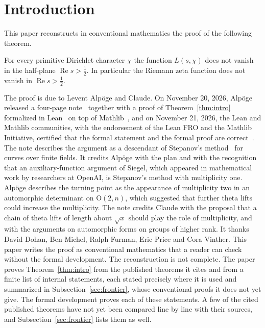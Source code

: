 \section{Introduction}\label{sec:intro}

This paper reconstructs in conventional mathematics the proof of the following theorem.

\begin{theorem}\label{thm:intro}
For every primitive Dirichlet character $\chi$ the function $L(s,\chi)$ does not vanish in the half-plane $\operatorname{Re}s>\frac12$. In particular the Riemann zeta function does not vanish in $\operatorname{Re}s>\frac12$.
\end{theorem}

The proof is due to Levent Alpöge and Claude. On November 20, 2026, Alpöge released a four-page note~\cite{note} together with a proof of Theorem~\ref{thm:intro} formalized in Lean~\cite{lean4} on top of Mathlib~\cite{mathlib}, and on November 21, 2026, the Lean and Mathlib communities, with the endorsement of the Lean FRO and the Mathlib Initiative, certified that the formal statement and the formal proof are correct~\cite{leanstatement}. The note describes the argument as a descendant of Stepanov's method~\cite{stepanov} for curves over finite fields. It credits Alpöge with the plan and with the recognition that an auxiliary-function argument of Siegel, which appeared in mathematical work by researchers at OpenAI, is Stepanov's method with multiplicity one. Alpöge describes the turning point as the appearance of multiplicity two in an automorphic determinant on $\mathrm O(2,n)$, which suggested that further theta lifts could increase the multiplicity. The note credits Claude with the proposal that a chain of theta lifts of length about $\sqrt x$ should play the role of multiplicity, and with the arguments on automorphic forms on groups of higher rank. It thanks David Dohan, Ben Michel, Ralph Furman, Eric Price and Cora Vinther. This paper writes the proof as conventional mathematics that a reader can check without the formal development. The reconstruction is not complete. The paper proves Theorem~\ref{thm:intro} from the published theorems it cites and from a finite list of internal statements, each stated precisely where it is used and summarized in Subsection~\ref{sec:frontier}, whose conventional proofs it does not yet give. The formal development proves each of these statements. A few of the cited published theorems have not yet been compared line by line with their sources, and Subsection~\ref{sec:frontier} lists them as well.

